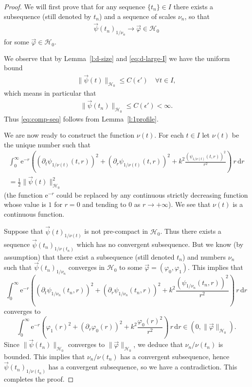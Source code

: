 \documentclass[10pt,reqno]{amsart}
\newcommand{\HH}{\mathcal{H}}
\newcommand{\fy}{\varphi}
\newcommand{\p}{\partial}
\newcommand{\EQ}[1]{\begin{equation}\begin{split} #1 \end{split}\end{equation}}
\numberwithin{equation}{section}
\theoremstyle{remark}
\newcommand{\rdr}{ \, r \, \mathrm{d}r}
\newcommand{\0}{\emptyset}
\newcommand{\eps}{\epsilon}
\begin{document}
\begin{proof}%
We will first prove that for any sequence $\{t_n \} \in I$ there exists a subsequence (still denoted by $t_n$) and a sequence of scales $\nu_n$,  so that 
\EQ{ 
\vec \psi(t_n)_{1/\nu_n} \to \vec \fy \in \HH_0 \label{eq:comp-seq}
} 
for some $\vec\fy \in \HH_0$. 

We observe that by Lemma~\ref{l:d-size} and \eqref{eq:d-large-I}  we have the uniform bound
\EQ{ \label{eq:IepsH} 
\| \vec \psi(t) \|_{\HH_0} \le C(\eps') \quad \forall t \in I,
}
which means in particular that 
\EQ{ \label{eq:tmH} 
\| \vec \psi(t_n) \|_{\HH_0} \le C(\eps') < \infty.
}
Thus \eqref{eq:comp-seq} follows from Lemma~\ref{l:1profile}.  

We are now ready to construct the function $\nu(t)$.
For each $t \in I$ let $\nu(t)$ be the unique number such that
\begin{equation}
\begin{gathered}
\int_0^\infty  \mathrm e^{-r}\left(( \p_t \psi_{1/\nu(t)}(t, r))^2+( \p_r \psi_{1/\nu(t)}(t, r))^2 +  k^2  \frac{(\psi_{1/\nu(t)}(t, r))^2}{r^2} \right) \rdr \\ = \frac 12 \| \vec \psi(t) \|_{\HH_0}^2
\end{gathered}
\end{equation}
(the function $\mathrm e^{-r}$ could be replaced by any continuous strictly decreasing function
whose value is $1$ for $r = 0$ and tending to $0$ as $r \to +\infty$).
We see that $\nu(t)$ is a continuous function.

Suppose that $\vec \psi(t)_{1/\nu(t)}$ is not pre-compact in $\HH_0$.
Thus there exists a sequence $\vec \psi(t_n)_{1/\nu(t_n)}$ which has no convergent subsequence.
But we know (by assumption) that there exist a subsequence (still denoted $t_n$)
and numbers $\nu_n$ such that $\vec \psi(t_n)_{1/\nu_n}$ converges in $\HH_0$
to some $\vec\fy = (\fy_0, \fy_1)$.
This implies that 
\begin{equation}
\int_0^\infty  \mathrm e^{-r}\left(( \p_t \psi_{1/\nu_n}(t_n, r))^2+( \p_r \psi_{1/\nu_n}(t_n, r))^2 +  k^2  \frac{(\psi_{1/\nu_n}(t_n, r))^2}{r^2} \right) \rdr
\end{equation}
converges to
\begin{equation}
\int_0^\infty  \mathrm e^{-r}\left(\fy_1(r)^2+( \p_r \fy_0(r))^2 +  k^2  \frac{\fy_0(r)^2}{r^2} \right) \rdr \in (0, \|\vec \fy\|_{\HH_0}).
\end{equation}
Since $\|\vec\psi(t_n)\|_{\HH_0}$ converges to $\|\vec\fy\|_{\HH_0}$,
we deduce that $\nu_n / \nu(t_n)$ is bounded.
This implies that $\nu_n / \nu(t_n)$ has a convergent subsequence,
hence $\vec \psi(t_n)_{1/\nu(t_n)}$ has a convergent subsequence,
so we have a contradiction. This completes the proof.
\end{proof}
\end{document}
